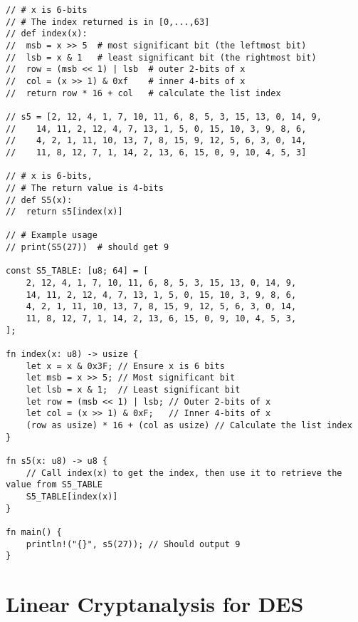 \begin{lstlisting}[style=C]
// # x is 6-bits
// # The index returned is in [0,...,63]
// def index(x):
//	msb = x >> 5  # most significant bit (the leftmost bit)
//	lsb = x & 1   # least significant bit (the rightmost bit)
//	row = (msb << 1) | lsb  # outer 2-bits of x
//	col = (x >> 1) & 0xf    # inner 4-bits of x
//	return row * 16 + col   # calculate the list index

// s5 = [2, 12, 4, 1, 7, 10, 11, 6, 8, 5, 3, 15, 13, 0, 14, 9,
//	  14, 11, 2, 12, 4, 7, 13, 1, 5, 0, 15, 10, 3, 9, 8, 6,
//	  4, 2, 1, 11, 10, 13, 7, 8, 15, 9, 12, 5, 6, 3, 0, 14,
//	  11, 8, 12, 7, 1, 14, 2, 13, 6, 15, 0, 9, 10, 4, 5, 3]

// # x is 6-bits,
// # The return value is 4-bits
// def S5(x):
// 	return s5[index(x)]

// # Example usage
// print(S5(27))  # should get 9

const S5_TABLE: [u8; 64] = [
	2, 12, 4, 1, 7, 10, 11, 6, 8, 5, 3, 15, 13, 0, 14, 9,
	14, 11, 2, 12, 4, 7, 13, 1, 5, 0, 15, 10, 3, 9, 8, 6,
	4, 2, 1, 11, 10, 13, 7, 8, 15, 9, 12, 5, 6, 3, 0, 14,
	11, 8, 12, 7, 1, 14, 2, 13, 6, 15, 0, 9, 10, 4, 5, 3,
];

fn index(x: u8) -> usize {
	let x = x & 0x3F; // Ensure x is 6 bits
	let msb = x >> 5; // Most significant bit
	let lsb = x & 1;  // Least significant bit
	let row = (msb << 1) | lsb; // Outer 2-bits of x
	let col = (x >> 1) & 0xF;   // Inner 4-bits of x
	(row as usize) * 16 + (col as usize) // Calculate the list index
}

fn s5(x: u8) -> u8 {
	// Call index(x) to get the index, then use it to retrieve the value from S5_TABLE
	S5_TABLE[index(x)]
}

fn main() {
	println!("{}", s5(27)); // Should output 9
}
\end{lstlisting}

\newpage
\section{Linear Cryptanalysis for DES}

